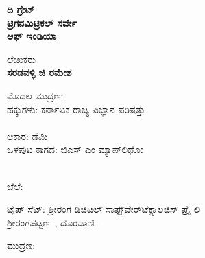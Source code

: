 \thispagestyle{empty}

\begin{center}
\textbf{ದಿ ಗ್ರೇಟ್​}\\\textbf{ಟ್ರಿಗನಮಿಟ್ರಿಕಲ್​ ಸರ್ವೇ}\\\textbf{ಆಫ್​ ಇಂಡಿಯಾ}
\end{center}

\vfill

\begin{center}
ಲೇಖಕರು\\\textbf{ಸರಡವಳ್ಳಿ ಜಿ ರಮೇಶ}
\end{center}

\vfill







\vfill

\begin{center}
ಮೊದಲ ಮುದ್ರಣ: \\ಹಕ್ಕುಗಳು: ಕರ್ನಾಟಕ ರಾಜ್ಯ ವಿಜ್ಞಾನ ಪರಿಷತ್ತು\\\\ಆಕಾರ:  ಡೆಮಿ\\ಒಳಪುಟ ಕಾಗದ:  ಜಿಎಸ್​ ಎಂ ಮ್ಯಾಪ್​ಲಿಥೋ
\end{center}

\begin{center}
\\ಬೆಲೆ:
\end{center}

\begin{center}
ಟೈಪ್​ ಸೆಟ್​: ಶ‍್ರೀರಂಗ ಡಿಜಿಟಲ್​ ಸಾಫ್ಟ್​ವೇರ್​ಟೆಕ್ನಾಲಜಿಸ್​ ಪ್ರೈ ಲಿ\\ಶ‍್ರೀರಂಗಪಟ್ಟಣ–, ದೂರವಾಣಿ–
\end{center}

\begin{center}
ಮುದ್ರಣ:
\end{center}

